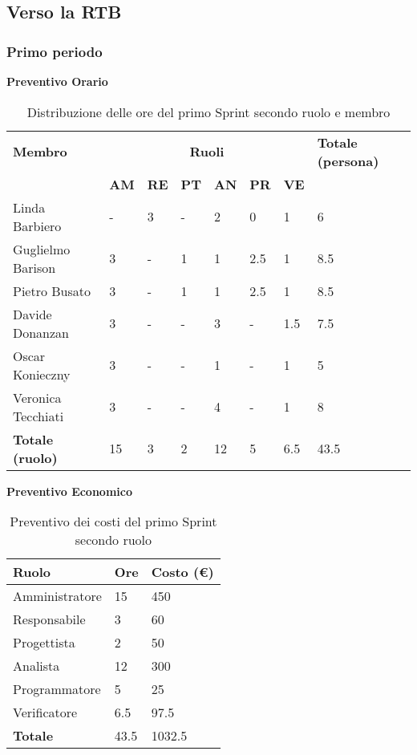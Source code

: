 \subsection{Verso la RTB}
\subsubsection{Primo periodo}
\textbf{Preventivo Orario}
\begin{table}[ht!]
	\centering
	\begin{tabular}{p{4cm} p{1cm} p{1cm} p{1cm} p{1cm} p{1cm} p{1cm} p{3cm}}
		\toprule
        \textbf{Membro} & \multicolumn{6}{c}{\textbf{Ruoli}} & \textbf{Totale (persona)}\\
		& \textbf{AM} & \textbf{RE} & \textbf{PT} & \textbf{AN} & \textbf{PR} & \textbf{VE}\\
		\midrule
        Linda Barbiero          & -     & 3     & -     & 2     & 0     & 1     & 6 \\
        Guglielmo Barison       & 3     & -     & 1     & 1     & 2.5   & 1     & 8.5\\
        Pietro Busato           & 3     & -     & 1     & 1     & 2.5   & 1     & 8.5 \\
        Davide Donanzan         & 3     & -     & -     & 3     & -     & 1.5   & 7.5 \\
        Oscar Konieczny         & 3     & -     & -     & 1     & -     & 1     & 5 \\
        Veronica Tecchiati      & 3     & -     & -     & 4     & -     & 1     & 8 \\
        \bottomrule
        \textbf{Totale (ruolo)} & 15     & 3     & 2     & 12   & 5     & 6.5   & 43.5 \\
	\end{tabular}
	\caption{Distribuzione delle ore del primo Sprint secondo ruolo e membro}
	\label{table:Distribuzione delle ore del primo Sprint secondo ruolo e membro}
\end{table}
\newpage
\textbf{Preventivo Economico}
\begin{table}[ht!]
	\centering
	\begin{tabular}{p{4cm} p{1cm} p{2cm}}
        \toprule
        \textbf{Ruolo} & \textbf{Ore} & \textbf{Costo (€)} \\
        \midrule
        Amministratore & 15 & 450 \\
        Responsabile & 3 & 60 \\
        Progettista & 2 & 50 \\
        Analista & 12 & 300 \\
        Programmatore & 5 & 25 \\
        Verificatore & 6.5 & 97.5 \\
        \bottomrule
        \textbf{Totale} & 43.5 & 1032.5
    \end{tabular}
    \caption{Preventivo dei costi del primo Sprint secondo ruolo}
	\label{table:Preventivo dei costi del primo Sprint secondo ruolo}
\end{table}

